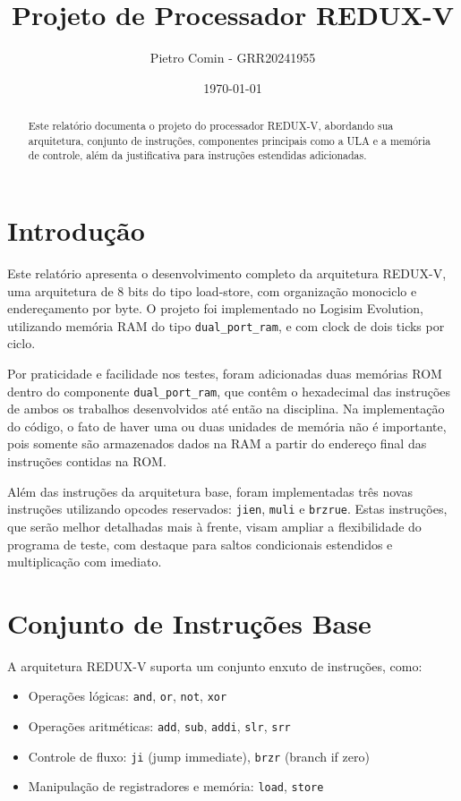 \documentclass[12pt]{article}
\title{Projeto de Processador REDUX-V}
\author{Pietro Comin - GRR20241955}
\date{\today}
\begin{document}
\maketitle

\begin{abstract}
Este relatório documenta o projeto do processador REDUX-V, abordando sua arquitetura, conjunto de instruções, componentes principais como a ULA e a memória de controle, além da justificativa para instruções estendidas adicionadas. 
\end{abstract}

\section{Introdução}

Este relatório apresenta o desenvolvimento completo da arquitetura REDUX-V, uma arquitetura de 8 bits do tipo load-store, com organização monociclo e endereçamento por byte. O projeto foi implementado no Logisim Evolution, utilizando memória RAM do tipo \texttt{dual\_port\_ram}, e com clock de dois ticks por ciclo. 

Por praticidade e facilidade nos testes, foram adicionadas duas memórias ROM dentro do componente \texttt{dual\_port\_ram}, que contêm o hexadecimal das instruções de ambos os trabalhos desenvolvidos até então na disciplina. Na implementação do código, o fato de haver uma ou duas unidades de memória não é importante, pois somente são armazenados dados na RAM a partir do endereço final das instruções contidas na ROM.

Além das instruções da arquitetura base, foram implementadas três novas instruções utilizando opcodes reservados: \texttt{jien}, \texttt{muli} e \texttt{brzrue}. Estas instruções, que serão melhor detalhadas mais à frente, visam ampliar a flexibilidade do programa de teste, com destaque para saltos condicionais estendidos e multiplicação com imediato.

\section{Conjunto de Instruções Base}

A arquitetura REDUX-V suporta um conjunto enxuto de instruções, como:

\begin{itemize}
  \item Operações lógicas: \texttt{and}, \texttt{or}, \texttt{not}, \texttt{xor}
  \item Operações aritméticas: \texttt{add}, \texttt{sub}, \texttt{addi}, \texttt{slr}, \texttt{srr}
  \item Controle de fluxo: \texttt{ji} (jump immediate), \texttt{brzr} (branch if zero)
  \item Manipulação de registradores e memória: \texttt{load}, \texttt{store}
\end{itemize}
\end{document}
